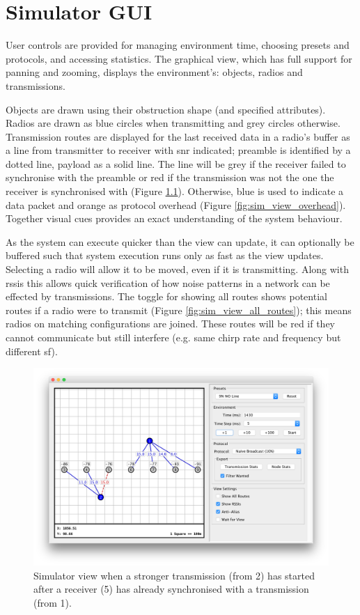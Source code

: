\chapter{Simulator GUI}\label{sec:simulator_pictures}
User controls are provided for managing environment time, choosing presets and protocols, and accessing statistics. The graphical view, which has full support for panning and zooming, displays the environment's: objects, radios and transmissions. 

Objects are drawn using their obstruction shape (and specified attributes).  Radios are drawn as blue circles when transmitting and grey circles otherwise. Transmission routes are displayed for the last received data in a radio's buffer as a line from transmitter to receiver with \ac{snr} indicated; preamble is identified by a dotted line, payload as a solid line. The line will be grey if the receiver failed to synchronise with the preamble or red if the transmission was not the one the receiver is synchronised with (Figure \ref{fig:sim_view_interference}). Otherwise, blue is used to indicate a data packet and orange as protocol overhead (Figure \ref{fig:sim_view_overhead}). Together visual cues provides an exact understanding of the system behaviour.

As the system can execute quicker than the view can update, it can optionally be buffered such that system execution runs only as fast as the view updates. Selecting a radio will allow it to be moved, even if it is transmitting. Along with \ac{rssi}s this allows quick verification of how noise patterns in a network can be effected by transmissions. The toggle for showing all routes shows potential routes if a radio were to transmit (Figure \ref{fig:sim_view_all_routes}); this means radios on matching configurations are joined. These routes will be red if they cannot communicate but still interfere (e.g. same chirp rate and frequency but different \ac{sf}).


\begin{figure}[H]
    \centering
   	\includegraphics[width=\textwidth]{Figures/simulator_interference}
    \caption[Simulator view with interference]{
    	Simulator view when a stronger transmission (from 2) has started after a receiver (5) has already synchronised with a transmission (from 1).
    	\label{fig:sim_view_interference}
    }
\end{figure}

